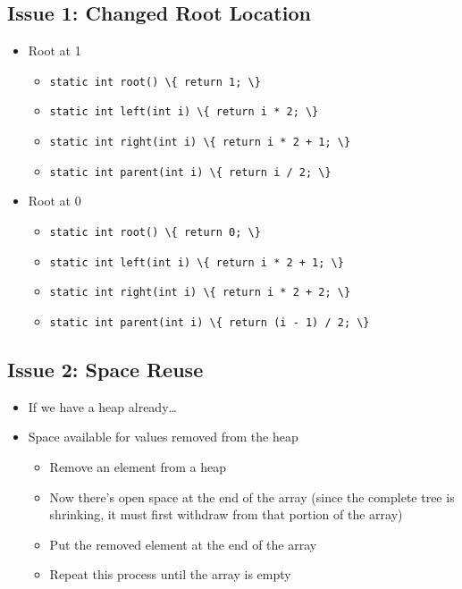 \documentclass[
  10pt,
  english,
  letterpaper,
,tablecaptionabove
]{scrartcl}
\newcommand{\passthrough}[1]{#1}
\providecommand{\tightlist}{%
  \setlength{\itemsep}{0pt}\setlength{\parskip}{0pt}}
\begin{document}
\hypertarget{issue-1-changed-root-location}{%
\subsection{Issue 1: Changed Root
Location}\label{issue-1-changed-root-location}}

\begin{itemize}
\tightlist
\item
  Root at 1

  \begin{itemize}
  \tightlist
  \item
    \passthrough{\lstinline!static int root() \{ return 1; \}!}
  \item
    \passthrough{\lstinline!static int left(int i) \{ return i * 2; \}!}
  \item
    \passthrough{\lstinline!static int right(int i) \{ return i * 2 + 1; \}!}
  \item
    \passthrough{\lstinline!static int parent(int i) \{ return i / 2; \}!}
  \end{itemize}
\item
  Root at 0

  \begin{itemize}
  \tightlist
  \item
    \passthrough{\lstinline!static int root() \{ return 0; \}!}
  \item
    \passthrough{\lstinline!static int left(int i) \{ return i * 2 + 1; \}!}
  \item
    \passthrough{\lstinline!static int right(int i) \{ return i * 2 + 2; \}!}
  \item
    \passthrough{\lstinline!static int parent(int i) \{ return (i - 1) / 2; \}!}
  \end{itemize}
\end{itemize}

\hypertarget{issue-2-space-reuse}{%
\subsection{Issue 2: Space Reuse}\label{issue-2-space-reuse}}

\begin{itemize}
\tightlist
\item
  If we have a heap already\ldots{}
\item
  Space available for values removed from the heap

  \begin{itemize}
  \tightlist
  \item
    Remove an element from a heap
  \item
    Now there's open space at the end of the array (since the complete
    tree is shrinking, it must first withdraw from that portion of the
    array)
  \item
    Put the removed element at the end of the array
  \item
    Repeat this process until the array is empty
  \end{itemize}
\end{itemize}
\end{document}
